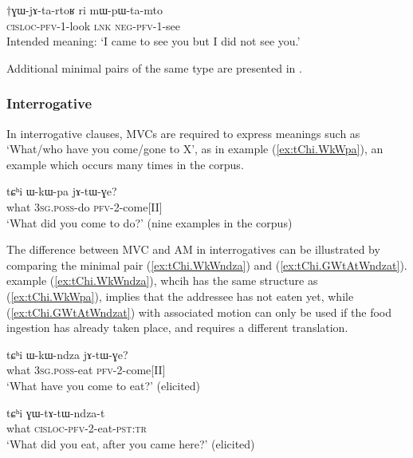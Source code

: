 \begin{exe}
\ex \label{ex:GWjAtartoR}
\gll $\dagger$ɣɯ-jɤ-ta-rtoʁ ri mɯ-pɯ-ta-mto \\
\textsc{cisloc}-\textsc{pfv}-1-look \textsc{lnk} \textsc{neg}-\textsc{pfv}-1-see \\
\glt Intended meaning: `I came to see you but I did not see you.' 
\end{exe}

Additional minimal pairs of the same type are presented in \citet[202-203]{jacques13harmonization}.

\subsubsection{Interrogative} \label{sec:am.interrogative}
In interrogative clauses, MVCs are required to express meanings such as `What/who have you come/gone to X', as in example (\ref{ex:tChi.WkWpa}), an example which occurs many times in the corpus.

\begin{exe}
\ex \label{ex:tChi.WkWpa}
\gll tɕʰi ɯ-kɯ-pa jɤ-tɯ-ɣe? \\
what \textsc{3sg.poss}-do \textsc{pfv}-2-come[II] \\
\glt `What did you come to do?' (nine examples in the corpus)
\end{exe}

The difference between MVC and AM in interrogatives can be illustrated by comparing the minimal pair  (\ref{ex:tChi.WkWndza}) and (\ref{ex:tChi.GWtAtWndzat}). example (\ref{ex:tChi.WkWndza}), whcih has the same structure as (\ref{ex:tChi.WkWpa}), implies that the addressee has not eaten yet, while (\ref{ex:tChi.GWtAtWndzat}) with associated motion can only be used if the food ingestion has already taken place, and requires a different translation.

\begin{exe}
\ex \label{ex:tChi.WkWndza}
\gll tɕʰi ɯ-kɯ-ndza jɤ-tɯ-ɣe? \\
what \textsc{3sg.poss}-eat \textsc{pfv}-2-come[II] \\
\glt `What have you come to eat?' (elicited)
\end{exe}

\begin{exe}
\ex \label{ex:tChi.GWtAtWndzat}
\gll tɕʰi ɣɯ-tɤ-tɯ-ndza-t \\
what \textsc{cisloc}-\textsc{pfv}-2-eat-\textsc{pst:tr}    \\
\glt `What did you eat, after you came here?' (elicited)
\end{exe}

